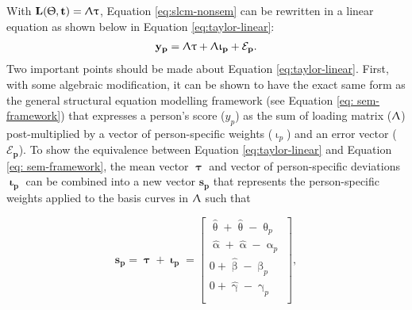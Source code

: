 \documentclass[
12pt, %
twoside,
english]{guelphthesis}
\begin{document}
With \(\mathbf{L(\Uptheta, t)} = \mathbf{\Uplambda\uptau}\), Equation \ref{eq:slcm-nonsem} can be rewritten in a linear equation as shown below in Equation \ref{eq:taylor-linear}:
\begin{align}
 \mathbf{y_p} = \mathbf{\Uplambda\uptau} + \mathbf{\Uplambda\upiota_p} + \mathbf{\mathcal{E}_p}.
 \label{eq:taylor-linear}
 \end{align}
\noindent Two important points should be made about Equation \ref{eq:taylor-linear}. First, with some algebraic modification, it can be shown to have the exact same form as the general structural equation modelling framework (see Equation \ref{eq: sem-framework}) that expresses a person's score (\(y_p\)) as the sum of loading matrix (\(\mathbf{\Uplambda}\)) post-multiplied by a vector of person-specific weights (\(\upiota_p\)) and an error vector (\(\mathbf{\mathcal{E}_p}\)). To show the equivalence between Equation \ref{eq:taylor-linear} and Equation \ref{eq: sem-framework}, the mean vector \(\mathbf{\uptau}\) and vector of
person-specific deviations \(\mathbf{\upiota_p}\) can be combined into a
new vector \(\mathbf{s_p}\) that represents the person-specific weights
applied to the basis curves in \(\mathbf{\Uplambda}\) such that

\[  
\mathbf{s_p} = \mathbf{\uptau + \upiota_p} =
\begin{bmatrix} 
\hat{\uptheta} + \hat{\uptheta} - \uptheta_p \\ 
\hat{\upalpha} + \hat{\upalpha} - \upalpha_p \\ 
0 + \hat{\upbeta} - \upbeta_p \\ 
0 + \hat{\upgamma} - \upgamma_p \\
\end{bmatrix},
\]
\end{document}
